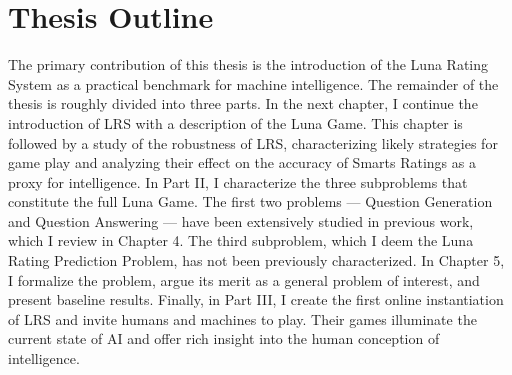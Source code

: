 \section{Thesis Outline}
The primary contribution of this thesis is the introduction of the Luna Rating System as a practical benchmark for machine intelligence. The remainder of the thesis is roughly divided into three parts. In the next chapter, I continue the introduction of LRS with a description of the Luna Game. This chapter is followed by a study of the robustness of LRS, characterizing likely strategies for game play and analyzing their effect on the accuracy of Smarts Ratings as a proxy for intelligence. In Part II, I characterize the three subproblems that constitute the full Luna Game. The first two problems --- Question Generation and Question Answering --- have been extensively studied in previous work, which I review in Chapter 4. The third subproblem, which I deem the Luna Rating Prediction Problem, has not been previously characterized. In Chapter 5, I formalize the problem, argue its merit as a general problem of interest, and present baseline results. Finally, in Part III, I create the first online instantiation of LRS and invite humans and machines to play. Their games illuminate the current state of AI and offer rich insight into the human conception of intelligence.
